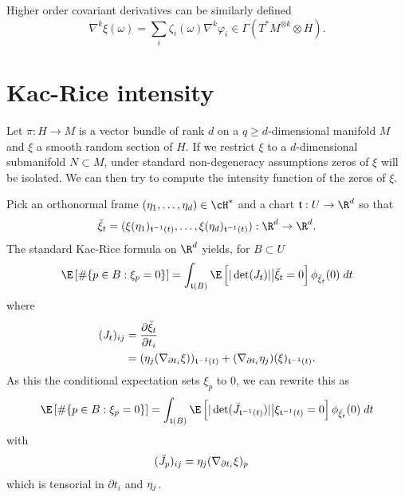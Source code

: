 \documentclass{article}
\newcommand{\randsec}{\xi}
\begin{document}
Higher order covariant derivatives can be similarly defined
$$
\nabla^k \randsec(\omega) = \sum_i \zeta_i(\omega) \nabla^k \varphi_i \in \Gamma(T^*M^{\otimes k} \otimes H).
$$

\section{Kac-Rice intensity}

\newcommand{\coordchart}{\mathfrak{t}}

Let $\pi:H \to M$ is a vector bundle of rank $d$ on a $q \geq d$-dimensional manifold $M$ and $\randsec$
a smooth random section of $H$. If we restrict $\randsec$ to a $d$-dimensional
submanifold $N \subset M$, under standard non-degeneracy assumptions zeros of $\randsec$ will be isolated.
We can then try to compute the intensity function of the zeros of $\randsec$.

Pick an orthonormal frame $(\ONF_1, \dots, \ONF_d) \in \cH^*$ and a chart
$\coordchart:U \to \R^d$ so that
$$
\breve{\randsec}_t = (\randsec(\ONF_1)_{\coordchart^{-1}(t)}, \dots, \randsec(\ONF_d)_{\coordchart^{-1}(t)}): \R^d \to \R^d.
$$
The standard Kac-Rice formula on $\R^d$ yields, for $B \subset U$
$$
\begin{aligned}
\E \left[ \#\{p \in B: \randsec_p=0\} \right] &= \int_{\coordchart(B)} \E\left[|\det(J_t)| \bigr | \breve{\randsec}_t=0 \right] \phi_{\breve{\randsec}_t}(0) \; dt \\
\end{aligned}
$$
where
$$
\begin{aligned}
  (J_t)_{ij} &= \frac{\partial \breve{\randsec}_t}{\partial t_i} \\
  &= (\ONF_j(\nabla_{\partial t_i}\randsec))_{\coordchart^{-1}(t)} + (\nabla_{\partial t_i} \ONF_j)(\randsec)_{\coordchart^{-1}(t)}. \\
\end{aligned}
$$
As this the conditional expectation sets $\randsec_p$ to 0, we can rewrite this as
$$
\begin{aligned}
\E \left[\# \{p \in B: \randsec_p=0\} \right] &= \int_{\coordchart(B)} \E \left[|\det(\breve{J}_{\coordchart^{-1}(t)})| \bigr | \randsec_{\coordchart^{-1}(t)}=0 \right] \phi_{\breve{\randsec}_t}(0) \; dt \\
\end{aligned}
$$
with
$$
\begin{aligned}
  (\breve{J}_p)_{ij} &= \ONF_j(\nabla_{\partial t_i}\randsec)_{p}
\end{aligned}
$$
which is tensorial in $\partial t_i$ and $\eta_j$.
\end{document}
